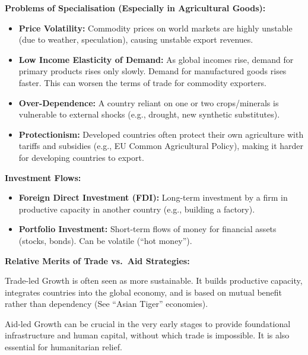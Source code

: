\documentclass[11pt, a4paper, twoside]{book}
\begin{document}
\textbf{Problems of Specialisation (Especially in Agricultural Goods):}
\begin{itemize}
  \item \textbf{Price Volatility:} Commodity prices on world markets are highly unstable (due to weather, speculation), causing unstable export revenues.
  \item \textbf{Low Income Elasticity of Demand:} As global incomes rise, demand for primary products rises only slowly. Demand for manufactured goods rises faster. This can worsen the terms of trade for commodity exporters.
  \item \textbf{Over-Dependence:} A country reliant on one or two crops/minerals is vulnerable to external shocks (e.g., drought, new synthetic substitutes).
  \item \textbf{Protectionism:} Developed countries often protect their own agriculture with tariffs and subsidies (e.g., EU Common Agricultural Policy), making it harder for developing countries to export.
\end{itemize}

\textbf{Investment Flows:}
\begin{itemize}
  \item \textbf{Foreign Direct Investment (FDI):} Long-term investment by a firm in productive capacity in another country (e.g., building a factory).
  \item \textbf{Portfolio Investment:} Short-term flows of money for financial assets (stocks, bonds). Can be volatile (``hot money'').
\end{itemize}

\textbf{Relative Merits of Trade vs.\ Aid Strategies:}

Trade-led Growth is often seen as more sustainable. It builds productive capacity, integrates countries into the global economy, and is based on mutual benefit rather than dependency (See ``Asian Tiger'' economies).

Aid-led Growth can be crucial in the very early stages to provide foundational infrastructure and human capital, without which trade is impossible. It is also essential for humanitarian relief.
\end{document}

